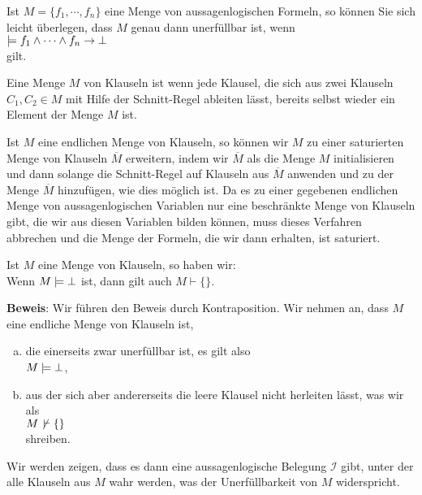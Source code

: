 \remark 
Ist $M = \{ f_1, \cdots, f_n \}$ eine Menge von aussagenlogischen Formeln, so können Sie sich leicht überlegen, dass
$M$ genau dann unerfüllbar ist, wenn
\\[0.2cm]
\hspace*{1.3cm}
$\models f_1 \wedge \cdots \wedge f_n \rightarrow \bot$
\\[0.2cm]
gilt. \eox

\begin{Definition} \hspace*{\fill} \linebreak
  Eine Menge $M$ von Klauseln ist   wenn jede Klausel, die sich aus zwei
  Klauseln $C_1,C_2 \in M$ mit Hilfe der Schnitt-Regel ableiten lässt, bereits selbst wieder ein Element der
  Menge $M$ ist.
\end{Definition}

\remark
Ist $M$ eine endlichen Menge von Klauseln, so können wir $M$ zu einer saturierten Menge von Klauseln
$\overline{M}$ erweitern, indem wir $\overline{M}$ als die Menge $M$ initialisieren und dann solange die
Schnitt-Regel auf Klauseln aus $\overline{M}$ anwenden und zu der Menge $\overline{M}$ hinzufügen, wie dies möglich
ist. Da es zu einer gegebenen endlichen Menge von aussagenlogischen Variablen nur eine beschränkte Menge von
Klauseln gibt, die wir aus diesen Variablen bilden können, muss dieses Verfahren abbrechen und die Menge der
Formeln, die wir dann erhalten, ist saturiert. \eox

\begin{Satz} \label{widerlegungs-vollstaendig}
  Ist  $M$ eine Menge von Klauseln,
  so haben wir:
  \\[0.2cm]
  \hspace*{1.3cm} 
  Wenn $M \models \bot$ ist, dann gilt auch  $M \vdash \{\}$.
\end{Satz}

\noindent
\textbf{Beweis}:  Wir führen den Beweis durch
Kontraposition.  Wir nehmen an, dass $M$ eine endliche Menge von Klauseln ist,
\begin{enumerate}[(a)]
\item die einerseits zwar unerfüllbar ist, es gilt also
      \\[0.2cm]
      \hspace*{1.3cm}
      $M \models \bot$,
\item aus der sich aber andererseits die leere Klausel nicht herleiten lässt, was wir als 
      \\[0.2cm]
      \hspace*{1.3cm}
      $M \not\,\vdash \{\}$
      \\[0.2cm]
      shreiben.
\end{enumerate}
Wir werden zeigen, dass es dann eine aussagenlogische Belegung $\mathcal{I}$ gibt, unter der alle Klauseln aus
$M$ wahr werden, was der Unerfüllbarkeit von $M$ widerspricht.

